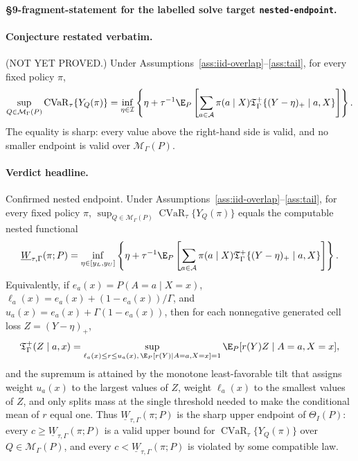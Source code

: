 
\paragraph{\S9-fragment-statement for the labelled solve target \texttt{nested-endpoint}.}
\paragraph{Conjecture restated verbatim.}\label{conj:nested-endpoint}
(NOT YET PROVED.)  Under Assumptions~\ref{ass:iid-overlap}--\ref{ass:tail}, for every fixed policy \(\pi\),
\[
\sup_{Q\in\mathcal M_\Gamma(P)}
\mathrm{CVaR}_\tau\{Y_Q(\pi)\}
=
\inf_{\eta\in\mathcal I}
\left\{\eta+\tau^{-1}\E_P\left[
\sum_{a\in\mathcal A}\pi(a\mid X)
\mathfrak T_{\Gamma}^{+}\{(Y-\eta)_+\mid a,X\}
\right]\right\}.
\]
The equality is sharp: every value above the right-hand side is valid, and no smaller endpoint is valid over \(\mathcal M_\Gamma(P)\).

\begin{theorem}\label{thm:nested-endpoint}
\paragraph{Verdict headline.}
Confirmed nested endpoint. Under Assumptions~\ref{ass:iid-overlap}--\ref{ass:tail}, for every fixed policy \(\pi\), \(\sup_{Q\in\mathcal M_\Gamma(P)}\operatorname{CVaR}_{\tau}\{Y_Q(\pi)\}\) equals the computable nested functional
\[
\underline W_{\tau,\Gamma}(\pi;P)=
\inf_{\eta\in[y_L,y_U]}
\left\{\eta+\tau^{-1}\E_P\left[
\sum_{a\in\mathcal A}\pi(a\mid X)
\mathfrak T_{\Gamma}^{+}\{(Y-\eta)_+\mid a,X\}
\right]\right\}.
\]
Equivalently, if \(e_a(x)=P(A=a\mid X=x)\), \(\ell_a(x)=e_a(x)+(1-e_a(x))/\Gamma\), and \(u_a(x)=e_a(x)+\Gamma(1-e_a(x))\), then for each nonnegative generated cell loss \(Z=(Y-\eta)_+\),
\[
\mathfrak T_{\Gamma}^{+}(Z\mid a,x)=
\sup_{\ell_a(x)\le r\le u_a(x),\, \E_P[r(Y)\mid A=a,X=x]=1}
\E_P[r(Y)Z\mid A=a,X=x],
\]
and the supremum is attained by the monotone least-favorable tilt that assigns weight \(u_a(x)\) to the largest values of \(Z\), weight \(\ell_a(x)\) to the smallest values of \(Z\), and only splits mass at the single threshold needed to make the conditional mean of \(r\) equal one. Thus \(\underline W_{\tau,\Gamma}(\pi;P)\) is the sharp upper endpoint of \(\Theta_I(P)\): every \(c\ge \underline W_{\tau,\Gamma}(\pi;P)\) is a valid upper bound for \(\operatorname{CVaR}_{\tau}\{Y_Q(\pi)\}\) over \(Q\in\mathcal M_\Gamma(P)\), and every \(c<\underline W_{\tau,\Gamma}(\pi;P)\) is violated by some compatible law.
\end{theorem}

